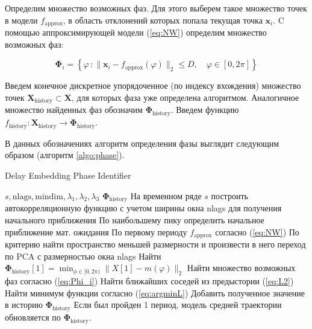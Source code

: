\documentclass[12pt, twoside]{article}
\theoremstyle{definition}
\begin{document}
Определим множество возможных фаз.
Для этого выберем такое множество точек в модели $f_{\text{approx}}$, в область отклонений которых попала текущая точка $\mathbf{x}_i$.
C помощью аппроксимирующей модели (\ref{eq:NW}) определим множество возможных фаз:

\begin{equation}           
    \mathbf{\Phi}_i = \left\{ \varphi\,:\|\mathbf{x}_i - f_{\text{approx}}(\varphi)\|_2\leq D,
    \quad
    \varphi \in [0,2\pi]\right\}
\label{eq:Phi_i} 
    \end{equation}

Введем конечное дискретное упорядоченное (по индексу вхождения) множество точек $\mathbf{X}_{\text{history}} \subset \mathbf{X}$, для которых фаза уже определена алгоритмом.
Аналогичное множество найденных фаз обозначим $\mathbf{\Phi}_{\text{history}}$.
Введем функцию $f_{\text{history}}: \mathbf{X}_{\text{history}} \rightarrow \mathbf{\Phi}_{\text{history}}$.

В данных обозначениях алгоритм определения фазы выглядит следующим образом (алгоритм \ref{algo:phase}).

\begin{algorithm}[!ht]
	\caption{Delay Embedding Phase Identifier}
	\begin{algorithmic}[1]
	\REQUIRE $s, \text{nlags}, \text{mindim}, \lambda_1,\lambda_2, \lambda_3$
    \ENSURE $\mathbf{\Phi}_{\text{history}}$
    \STATE На временном ряде $s$ построить автокорреляционную функцию с учетом ширины окна nlags для получения начального приближения
	\STATE По наибольшему пику определить начальное приближение мат. ожидания
	\STATE По первому периоду $f_{\text{approx}}$ согласно (\ref{eq:NW})
	\STATE По критерию найти пространство меньшей размерности и произвести в него переход по PCA с размерностью окна nlags
	\STATE Найти $\mathbf{\Phi}_{\text{history}}[1] = \min_{\phi \in [0,2\pi)}\|X[1] - m(\varphi)\|_2 $
	\STATE Найти множество возможных фаз согласно (\ref{eq:Phi_i})
	\STATE Найти ближайших соседей из предыстории (\ref{eq:L2})
	\STATE Найти минимум функции согласно  (\ref{eq:argminL})
	\STATE Добавить полученное значение в историю $\mathbf{\Phi}_{\text{history}}$
	\STATE Если был пройден 1 период, модель средней траектории обновляется по $\mathbf{\Phi}_{\text{history}}$.
	\ENDWHILE
	\end{algorithmic}
	\label{algo:phase}
\end{algorithm} 
\end{document}
